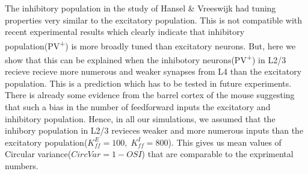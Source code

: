 The inhibitory population in the study of Hansel \& Vreeswijk \cite{Hansel2012} had tuning properties very similar to the excitatory population. This is not compatible with recent experimental results which clearly indicate that inhibitory population(PV\textsuperscript{+}) is more broadly tuned than excitatory neurons. But, here we show that this can be explained when the inhibotory neurons(PV\textsuperscript{+}) in L2/3 recieve recieve more numerous and weaker synapses from L4 than the excitatory population. This is a prediction which has to be tested in future experiments. There is already some evidence from the barrel cortex of the mouse suggesting that such a bias in the number of feedforward inputs the excitatory and inhibitory population. Hence, in all our simulations, we assumed that the inhibory population in L2/3 revieces weaker and more numerous inputs than the excitatory population($K_{ff}^{E} = 100, \; K_{ff}^{I} = 800$). This gives us mean values of Circular variance($CircVar = 1 - OSI$) that are comparable to the exprimental numbers. 



